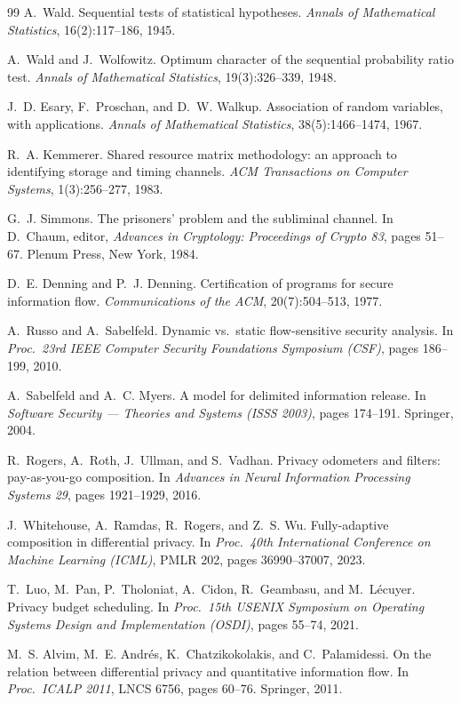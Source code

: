 \documentclass[11pt,a4paper]{article}
\theoremstyle{definition}
\begin{document}
\begin{thebibliography}{99}
 A.~Wald. Sequential tests of statistical hypotheses. \emph{Annals of Mathematical
Statistics}, 16(2):117--186, 1945.

 A.~Wald and J.~Wolfowitz. Optimum character of the sequential probability
ratio test. \emph{Annals of Mathematical Statistics}, 19(3):326--339, 1948.

 J.~D. Esary, F.~Proschan, and D.~W. Walkup. Association of random variables, with
applications. \emph{Annals of Mathematical Statistics}, 38(5):1466--1474, 1967.

 R.~A. Kemmerer. Shared resource matrix methodology: an approach to identifying
storage and timing channels. \emph{ACM Transactions on Computer Systems}, 1(3):256--277, 1983.

 G.~J. Simmons. The prisoners' problem and the subliminal channel. In
D.~Chaum, editor, \emph{Advances in Cryptology: Proceedings of Crypto 83}, pages 51--67. Plenum
Press, New York, 1984.

 D.~E. Denning and P.~J. Denning. Certification of programs for secure
information flow. \emph{Communications of the ACM}, 20(7):504--513, 1977.

 A.~Russo and A.~Sabelfeld. Dynamic vs.\ static flow-sensitive security analysis. In
\emph{Proc.\ 23rd IEEE Computer Security Foundations Symposium (CSF)}, pages 186--199, 2010.

 A.~Sabelfeld and A.~C. Myers. A model for delimited information release. In
\emph{Software Security --- Theories and Systems (ISSS 2003)}, pages 174--191. Springer, 2004.

 R.~Rogers, A.~Roth, J.~Ullman, and S.~Vadhan. Privacy odometers and filters:
pay-as-you-go composition. In \emph{Advances in Neural Information Processing Systems 29}, pages
1921--1929, 2016.

 J.~Whitehouse, A.~Ramdas, R.~Rogers, and Z.~S. Wu. Fully-adaptive composition in
differential privacy. In \emph{Proc.\ 40th International Conference on Machine Learning (ICML)},
PMLR 202, pages 36990--37007, 2023.

 T.~Luo, M.~Pan, P.~Tholoniat, A.~Cidon, R.~Geambasu, and M.~L\'ecuyer. Privacy
budget scheduling. In \emph{Proc.\ 15th USENIX Symposium on Operating Systems Design and
Implementation (OSDI)}, pages 55--74, 2021.

 M.~S. Alvim, M.~E. Andr\'es, K.~Chatzikokolakis, and C.~Palamidessi. On the
relation between differential privacy and quantitative information flow. In \emph{Proc.\ ICALP
2011}, LNCS 6756, pages 60--76. Springer, 2011.


\end{thebibliography}
\end{document}

